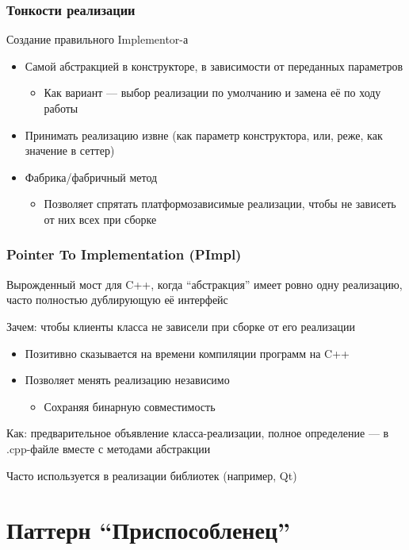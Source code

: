 \documentclass[xetex,mathserif,serif]{beamer}
\begin{document}
	\begin{frame}
		\frametitle{Тонкости реализации}
		Создание правильного Implementor-а
		\begin{itemize}
			\item Самой абстракцией в конструкторе, в зависимости от переданных параметров
			\begin{itemize}
				\item Как вариант --- выбор реализации по умолчанию и замена её по ходу работы
			\end{itemize}
			\item Принимать реализацию извне (как параметр конструктора, или, реже, как значение в сеттер)
			\item Фабрика/фабричный метод
			\begin{itemize}
				\item Позволяет спрятать платформозависимые реализации, чтобы не зависеть от них всех при сборке
			\end{itemize}
		\end{itemize}
	\end{frame}

	\begin{frame}
		\frametitle{Pointer To Implementation (PImpl)}
		Вырожденный мост для C++, когда ``абстракция'' имеет ровно одну реализацию, часто полностью дублирующую её интерфейс

		Зачем: чтобы клиенты класса не зависели при сборке от его реализации

		\begin{itemize}
			\item Позитивно сказывается на времени компиляции программ на C++
			\item Позволяет менять реализацию независимо
			\begin{itemize}
				\item Сохраняя бинарную совместимость
			\end{itemize}
		\end{itemize}

		Как: предварительное объявление класса-реализации, полное определение --- в .cpp-файле вместе с методами абстракции

		Часто используется в реализации библиотек (например, Qt)
	\end{frame}

	\section{Паттерн ``Приспособленец''}
\end{document}
